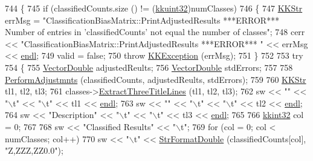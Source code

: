 \begin{DoxyCode}
744 \{
745   \textcolor{keywordflow}{if}  (classifiedCounts.size () != (\hyperlink{namespace_k_k_b_af8d832f05c54994a1cce25bd5743e19a}{kkuint32})numClasses)
746   \{
747     \hyperlink{class_k_k_b_1_1_k_k_str}{KKStr}  errMsg = \textcolor{stringliteral}{"ClassificationBiasMatrix::PrintAdjustedResults  ***ERROR***    Number of entries
       in 'classifiedCounts' not equal the number of classes"};
748     cerr << \textcolor{stringliteral}{"ClassificationBiasMatrix::PrintAdjustedResults  ***ERROR***  "} << errMsg << 
      \hyperlink{namespace_k_k_b_ad1f50f65af6adc8fa9e6f62d007818a8}{endl};
749     valid = \textcolor{keyword}{false};
750     \textcolor{keywordflow}{throw} \hyperlink{class_k_k_b_1_1_k_k_exception}{KKException} (errMsg);
751   \}
752 
753   \textcolor{keywordflow}{try}
754   \{
755     \hyperlink{namespace_k_k_b_a5906c207479607e5f450434095914a41}{VectorDouble}   adjustedReults;
756     \hyperlink{namespace_k_k_b_a5906c207479607e5f450434095914a41}{VectorDouble}   stdErrors;
757     
758     \hyperlink{class_k_k_m_l_l_1_1_classification_bias_matrix_a4d57dd2cd586fae99f5cd3912f1cda04}{PerformAdjustmnts} (classifiedCounts, adjustedReults, stdErrors);
759 
760     \hyperlink{class_k_k_b_1_1_k_k_str}{KKStr}  tl1, tl2, tl3;
761     classes->\hyperlink{class_k_k_m_l_l_1_1_m_l_class_list_ab333df46b706048637bb7b98ef552f59}{ExtractThreeTitleLines} (tl1, tl2, tl3);
762     sw << \textcolor{stringliteral}{""}             << \textcolor{stringliteral}{"\(\backslash\)t"} << \textcolor{stringliteral}{"\(\backslash\)t"} << tl1 << \hyperlink{namespace_k_k_b_ad1f50f65af6adc8fa9e6f62d007818a8}{endl};
763     sw << \textcolor{stringliteral}{""}             << \textcolor{stringliteral}{"\(\backslash\)t"} << \textcolor{stringliteral}{"\(\backslash\)t"} << tl2 << \hyperlink{namespace_k_k_b_ad1f50f65af6adc8fa9e6f62d007818a8}{endl};
764     sw << \textcolor{stringliteral}{"Description"}  << \textcolor{stringliteral}{"\(\backslash\)t"} << \textcolor{stringliteral}{"\(\backslash\)t"} << tl3 << \hyperlink{namespace_k_k_b_ad1f50f65af6adc8fa9e6f62d007818a8}{endl};
765    
766     \hyperlink{namespace_k_k_b_a8fa4952cc84fda1de4bec1fbdd8d5b1b}{kkint32}  col = 0;
767 
768     sw << \textcolor{stringliteral}{"Classified Results"} << \textcolor{stringliteral}{"\(\backslash\)t"};
769     \textcolor{keywordflow}{for}  (col = 0;  col < numClasses;  col++)
770       sw << \textcolor{stringliteral}{"\(\backslash\)t"} << \hyperlink{namespace_k_k_b_a1a40a40e955fa5417a7cdd990e0021b1}{StrFormatDouble} (classifiedCounts[col], \textcolor{stringliteral}{"Z,ZZZ,ZZ0.0"});

\end{DoxyCode}
